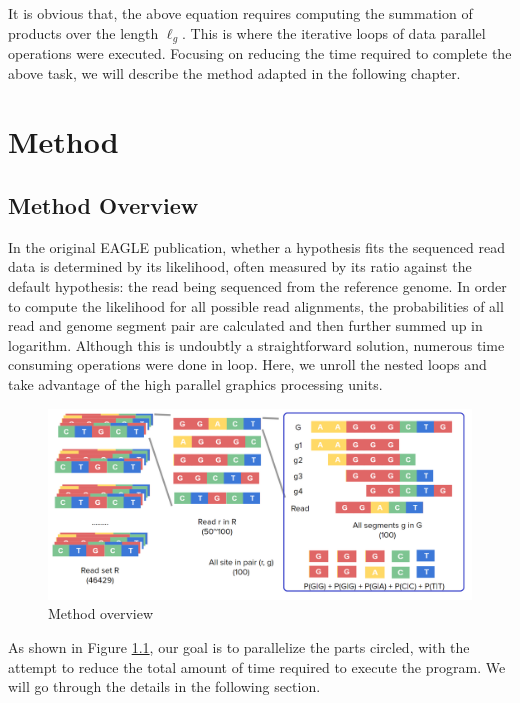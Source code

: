 \documentclass{PHlab-thesis}
\begin{document}
It is obvious that, the above equation requires computing the summation of products over the length $\ell_g$. This is where the iterative loops of data parallel operations were executed. Focusing on reducing the time required to complete the above task, we will describe the method adapted in the following chapter.

\chapter{Method}
\section{Method Overview}
In the original EAGLE publication, whether a hypothesis fits the sequenced read data is determined by its likelihood, often measured by its ratio against the default hypothesis: the read being sequenced from the reference genome. In order to compute the likelihood for all possible read alignments, the probabilities of all read and genome segment pair are calculated and then further summed up in logarithm. Although this is undoubtly a straightforward solution, numerous time consuming operations were done in loop. Here, we unroll the nested loops and take advantage of the high parallel graphics processing units. 


\begin{figure}
	\centering
	\includegraphics[scale=0.3]{figures/overview.png}
	\caption{Method overview}
	\label{fig:overview} %
\end{figure}

As shown in Figure \ref{fig:overview}, our goal is to parallelize the parts circled, with the attempt to reduce the total amount of time required to execute the program. We will go through the details in the following section.
\end{document}
